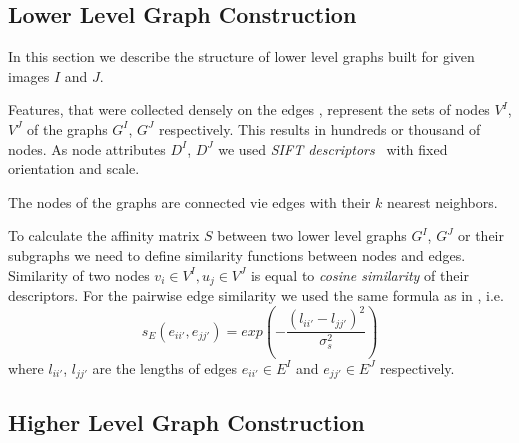 \FloatBarrier

\subsection{Lower Level Graph Construction}

In this section we describe the structure of lower level graphs built for given images $I$ and $J$.

Features, that were collected densely on the edges \cite{PMT}, represent the sets of nodes $V^I$, $V^J$ of the graphs $G^I$, $G^J$ respectively. This results in hundreds or thousand of nodes. As node attributes $D^I$, $D^J$ we used \emph{SIFT descriptors}~\cite{Lowe2004} with fixed orientation and scale. 

The nodes of the graphs are connected vie edges with their $k$ nearest neighbors.

To calculate the affinity matrix $S$ between two lower level graphs  $G^I$, $G^J$ or their subgraphs we need to define similarity functions between nodes and edges. Similarity of two nodes $v_i\in V^I, u_j\in V^J$ is equal to \emph{cosine similarity} of their descriptors.
For the pairwise edge similarity we used the same formula as in \cite{Cho2014_Haystack, Suh_CVPR2015}, i.e.\ 
\begin{equation}
s_E(e_{ii\prime}, e_{jj\prime}) = exp(-\frac{(l_{ii\prime} - l_{jj\prime})^2}{\sigma^2_{s}})
\label{eq:s_e}
\end{equation}
where $l_{ii\prime}$, $l_{jj\prime} $ are the lengths of edges $e_{ii\prime}\in E^I$ and $e_{jj\prime}\in E^J$ respectively.




\subsection{Higher Level Graph Construction}


